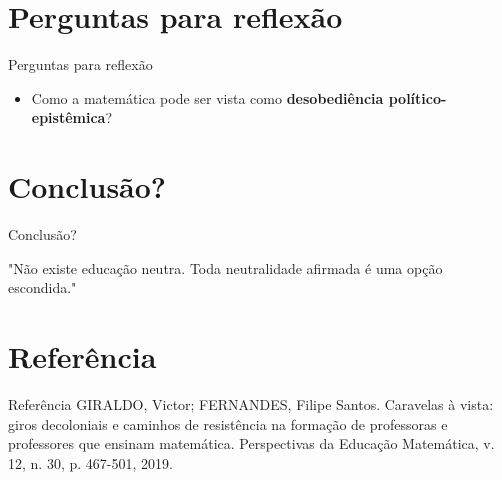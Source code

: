 \documentclass[12pt]{beamer}
\begin{document}
	\section{Perguntas para reflexão}
		
		\begin{frame}{Perguntas para reflexão}
			\begin{itemize}
				\justifying
				\item Como a matemática pode ser vista como \textbf{desobediência político-epistêmica}?
				
				
			\end{itemize} 
	
		\end{frame}
		
	\section{Conclusão?}
	
		\begin{frame}{Conclusão?}
			
			\justifying "Não existe educação neutra. Toda neutralidade afirmada é
				uma opção escondida."
				
		\end{frame}
	\section{Referência}
	
		\begin{frame}{Referência}
			\justifying
			\small
			GIRALDO, Victor; FERNANDES, Filipe Santos. Caravelas à vista: giros decoloniais e caminhos de resistência na formação de professoras e professores que ensinam matemática. Perspectivas da Educação Matemática, v. 12, n. 30, p. 467-501, 2019.

		\end{frame}
	
\end{document}
